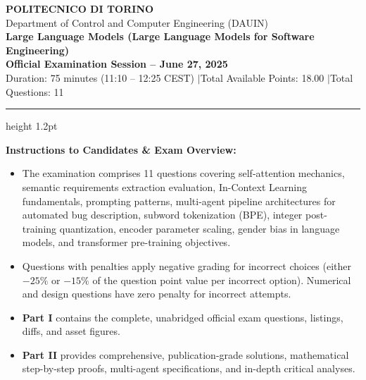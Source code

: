 \documentclass[11pt,a4paper]{article}
\begin{document}
\begin{center}
    {\Large\textbf{\color{primary}POLITECNICO DI TORINO}}\\[3pt]
    {\large Department of Control and Computer Engineering (DAUIN)}\\[4pt]
    {\Large\textbf{\color{secondary}Large Language Models (Large Language Models for Software Engineering)}}\\[6pt]
    {\large\textbf{Official Examination Session -- June 27, 2025}}\\[3pt]
    \small Duration: 75 minutes (11:10 -- 12:25 CEST) \quad$\vert$\quad Total Available Points: 18.00 \quad$\vert$\quad Total Questions: 11
\end{center}
\vspace{-4pt}
\hrule height 1.2pt
\vspace{8pt}

\noindent
\begin{tcolorbox}[colback=white,colframe=primary!70,arc=1.5mm,boxrule=0.7pt,left=8pt,right=8pt,top=6pt,bottom=6pt]
\footnotesize
\textbf{Instructions to Candidates \& Exam Overview:}
\begin{itemize}[leftmargin=1.5em]
    \item The examination comprises 11 questions covering self-attention mechanics, semantic requirements extraction evaluation, In-Context Learning fundamentals, prompting patterns, multi-agent pipeline architectures for automated bug description, subword tokenization (BPE), integer post-training quantization, encoder parameter scaling, gender bias in language models, and transformer pre-training objectives.
    \item Questions with penalties apply negative grading for incorrect choices (either $-25\%$ or $-15\%$ of the question point value per incorrect option). Numerical and design questions have zero penalty for incorrect attempts.
    \item \textbf{Part I} contains the complete, unabridged official exam questions, listings, diffs, and asset figures.
    \item \textbf{Part II} provides comprehensive, publication-grade solutions, mathematical step-by-step proofs, multi-agent specifications, and in-depth critical analyses.
\end{itemize}
\end{tcolorbox}

\vspace{4pt}
\end{document}
